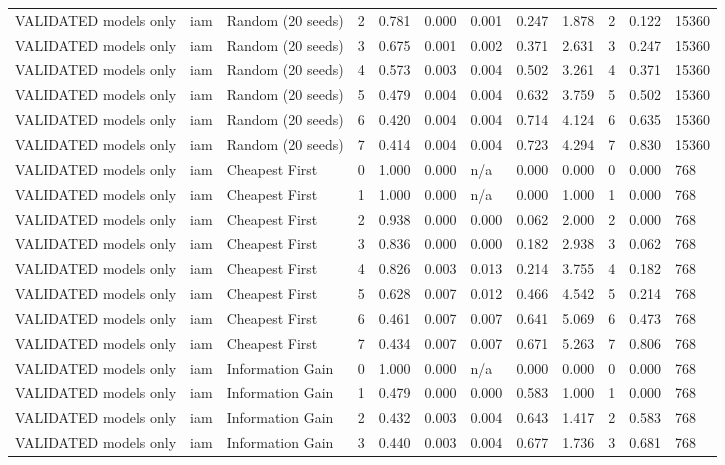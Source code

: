 \begin{table}[!ht]
{\begin{tabular}{llllllllllll}
VALIDATED models only & iam & Random (20 seeds) & 2 & 0.781 & 0.000 & 0.001 & 0.247 & 1.878 & 2 & 0.122 & 15360 \\
VALIDATED models only & iam & Random (20 seeds) & 3 & 0.675 & 0.001 & 0.002 & 0.371 & 2.631 & 3 & 0.247 & 15360 \\
VALIDATED models only & iam & Random (20 seeds) & 4 & 0.573 & 0.003 & 0.004 & 0.502 & 3.261 & 4 & 0.371 & 15360 \\
VALIDATED models only & iam & Random (20 seeds) & 5 & 0.479 & 0.004 & 0.004 & 0.632 & 3.759 & 5 & 0.502 & 15360 \\
VALIDATED models only & iam & Random (20 seeds) & 6 & 0.420 & 0.004 & 0.004 & 0.714 & 4.124 & 6 & 0.635 & 15360 \\
VALIDATED models only & iam & Random (20 seeds) & 7 & 0.414 & 0.004 & 0.004 & 0.723 & 4.294 & 7 & 0.830 & 15360 \\
VALIDATED models only & iam & Cheapest First & 0 & 1.000 & 0.000 & n/a & 0.000 & 0.000 & 0 & 0.000 & 768 \\
VALIDATED models only & iam & Cheapest First & 1 & 1.000 & 0.000 & n/a & 0.000 & 1.000 & 1 & 0.000 & 768 \\
VALIDATED models only & iam & Cheapest First & 2 & 0.938 & 0.000 & 0.000 & 0.062 & 2.000 & 2 & 0.000 & 768 \\
VALIDATED models only & iam & Cheapest First & 3 & 0.836 & 0.000 & 0.000 & 0.182 & 2.938 & 3 & 0.062 & 768 \\
VALIDATED models only & iam & Cheapest First & 4 & 0.826 & 0.003 & 0.013 & 0.214 & 3.755 & 4 & 0.182 & 768 \\
VALIDATED models only & iam & Cheapest First & 5 & 0.628 & 0.007 & 0.012 & 0.466 & 4.542 & 5 & 0.214 & 768 \\
VALIDATED models only & iam & Cheapest First & 6 & 0.461 & 0.007 & 0.007 & 0.641 & 5.069 & 6 & 0.473 & 768 \\
VALIDATED models only & iam & Cheapest First & 7 & 0.434 & 0.007 & 0.007 & 0.671 & 5.263 & 7 & 0.806 & 768 \\
VALIDATED models only & iam & Information Gain & 0 & 1.000 & 0.000 & n/a & 0.000 & 0.000 & 0 & 0.000 & 768 \\
VALIDATED models only & iam & Information Gain & 1 & 0.479 & 0.000 & 0.000 & 0.583 & 1.000 & 1 & 0.000 & 768 \\
VALIDATED models only & iam & Information Gain & 2 & 0.432 & 0.003 & 0.004 & 0.643 & 1.417 & 2 & 0.583 & 768 \\
VALIDATED models only & iam & Information Gain & 3 & 0.440 & 0.003 & 0.004 & 0.677 & 1.736 & 3 & 0.681 & 768 \\

\end{tabular}}
\end{table}
